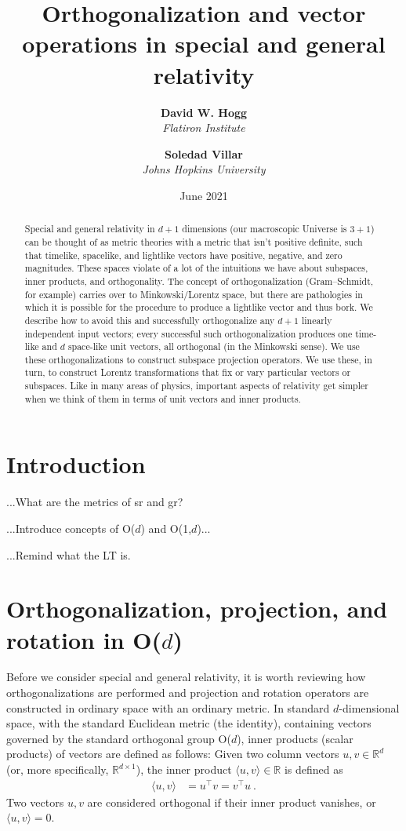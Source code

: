 \documentclass{article}
\title{\bfseries Orthogonalization and vector operations in special and general relativity}
\author{\textbf{David W. Hogg}\\
        \textsl{Flatiron Institute}\\
        \and
        \textbf{Soledad Villar}\\
        \textsl{Johns Hopkins University}}
\date{June 2021}
\newcommand{\inner}[2]{\langle{#1},{#2}\rangle}
\begin{document}
\thispagestyle{plain}
\maketitle

\begin{abstract}\noindent
    Special and general relativity in $d+1$ dimensions (our macroscopic Universe is $3+1$) can be thought of as metric theories with a metric that isn't positive definite, such that timelike, spacelike, and lightlike vectors have positive, negative, and zero magnitudes.
    These spaces violate of a lot of the intuitions we have about subspaces, inner products, and orthogonality.
    The concept of orthogonalization (Gram--Schmidt, for example) carries over to Minkowski/Lorentz space, but there are pathologies in which it is possible for the procedure to produce a lightlike vector and thus bork.
    We describe how to avoid this and successfully orthogonalize any $d+1$ linearly independent input vectors; every successful such orthogonalization produces one time-like and $d$ space-like unit vectors, all orthogonal (in the Minkowski sense).
    We use these orthogonalizations to construct subspace projection operators.
    We use these, in turn, to construct Lorentz transformations that fix or vary particular vectors or subspaces.
    Like in many areas of physics, important aspects of relativity get simpler when we think of them in terms of unit vectors and inner products.
\end{abstract}

\section{Introduction}

...What are the metrics of sr and gr?

...Introduce concepts of O($d$) and O(1,$d$)...

...Remind what the LT is.

\section{Orthogonalization, projection, and rotation in O($d$)}

Before we consider special and general relativity, it is worth reviewing how orthogonalizations are performed and projection and rotation operators are constructed in ordinary space with an ordinary metric.
In standard $d$-dimensional space, with the standard Euclidean metric (the identity), containing vectors governed by the standard orthogonal group O($d$), inner products (scalar products) of vectors are defined as follows:
Given two column vectors $u,v\in\mathbb{R}^d$ (or, more specifically, $\mathbb{R}^{d\times1}$), the inner product $\inner{u}{v}\in\mathbb{R}$ is defined as
\begin{align}
    \inner{u}{v} &= u^\top v = v^\top u ~.
\end{align}
Two vectors $u,v$ are considered orthogonal if their inner product vanishes, or $\inner{u}{v}=0$.
\end{document}
